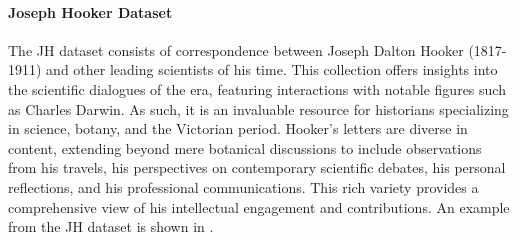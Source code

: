 
\paragraph*{Joseph Hooker Dataset}
\label{par:3_joseph_hooker_dataset}
The JH dataset consists of correspondence between Joseph Dalton Hooker (1817-1911) and other leading scientists of his time. This collection offers insights into the scientific dialogues of the era, featuring interactions with notable figures such as Charles Darwin. As such, it is an invaluable resource for historians specializing in science, botany, and the Victorian period. Hooker’s letters are diverse in content, extending beyond mere botanical discussions to include observations from his travels, his perspectives on contemporary scientific debates, his personal reflections, and his professional communications. This rich variety provides a comprehensive view of his intellectual engagement and contributions. An example from the JH dataset is shown in .


